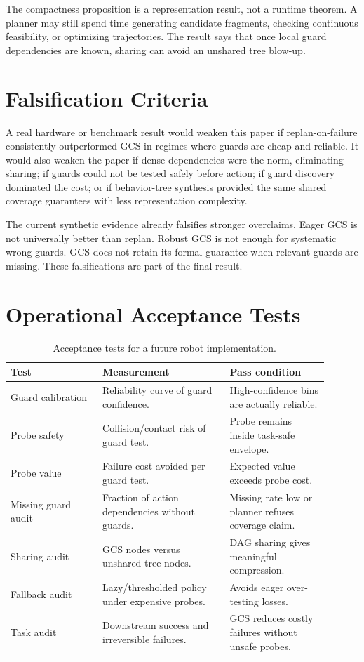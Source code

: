 \documentclass{article}
\begin{document}
The compactness proposition is a representation result, not a runtime theorem. A planner may still spend time generating candidate fragments, checking continuous feasibility, or optimizing trajectories. The result says that once local guard dependencies are known, sharing can avoid an unshared tree blow-up.

\section{Falsification Criteria}
A real hardware or benchmark result would weaken this paper if replan-on-failure consistently outperformed GCS in regimes where guards are cheap and reliable. It would also weaken the paper if dense dependencies were the norm, eliminating sharing; if guards could not be tested safely before action; if guard discovery dominated the cost; or if behavior-tree synthesis provided the same shared coverage guarantees with less representation complexity.

The current synthetic evidence already falsifies stronger overclaims. Eager GCS is not universally better than replan. Robust GCS is not enough for systematic wrong guards. GCS does not retain its formal guarantee when relevant guards are missing. These falsifications are part of the final result.

\section{Operational Acceptance Tests}
\begin{table}[p]
\centering
\caption{Acceptance tests for a future robot implementation.}
\label{tab:acceptance}
\small
\begin{tabular}{p{0.26\linewidth}p{0.36\linewidth}p{0.28\linewidth}}
\toprule
Test & Measurement & Pass condition\\
\midrule
Guard calibration & Reliability curve of guard confidence. & High-confidence bins are actually reliable.\\
Probe safety & Collision/contact risk of guard test. & Probe remains inside task-safe envelope.\\
Probe value & Failure cost avoided per guard test. & Expected value exceeds probe cost.\\
Missing guard audit & Fraction of action dependencies without guards. & Missing rate low or planner refuses coverage claim.\\
Sharing audit & GCS nodes versus unshared tree nodes. & DAG sharing gives meaningful compression.\\
Fallback audit & Lazy/thresholded policy under expensive probes. & Avoids eager over-testing losses.\\
Task audit & Downstream success and irreversible failures. & GCS reduces costly failures without unsafe probes.\\
\bottomrule
\end{tabular}
\end{table}
\end{document}

